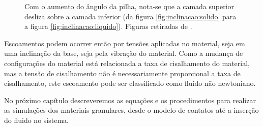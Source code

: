 \begin{figure}
\begin{minipage}{.45\linewidth}
        \label{fig:inclinacao:liquido}
    \end{minipage}
    \caption{Com o aumento do ângulo da pilha, nota-se que a camada superior desliza sobre a camada inferior (da figura \ref{fig:inclinacao:solido} para a figura \ref{fig:inclinacao:liquido}). Figuras retiradas de \cite{Granular_Solids_Liquids_and_Gases}.}
    \label{fig:inclinacao}
\end{figure}

    Escoamentos podem ocorrer então por tensões aplicadas no material, seja em uma inclinação da base, seja pela vibração do material. Como a mudança de configurações do material está relacionada a taxa de cisalhamento do material, mas a tensão de cisalhamento não é necessariamente proporcional a taxa de cisalhamento, este escoamento pode ser classificado como fluido não newtoniano.



    No próximo capítulo descreveremos as equações e os procedimentos para realizar as simulações dos materiais granulares, desde o modelo de contatos até a inserção do fluido no sistema.
